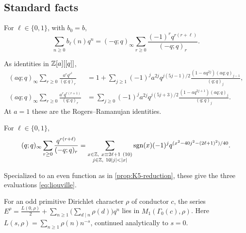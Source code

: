 \subsection{Standard facts}

\begin{fact}\label{fact:DKS}
For $\ell\in\{0,1\}$, with $b_0=b$,
\[
  \sum_{n\ge0}b_\ell(n)q^n=(-q;q)_\infty\sum_{r\ge0}\frac{(-1)^rq^{r(r+\ell)}}{(-q;q)_r}.
\]
\end{fact}

\begin{fact}\label{fact:Sills}
As identities in $\mathbb{Z}[a][[q]]$,
\begin{align*}
  (aq;q)_\infty\sum_{r\ge0}\frac{a^rq^{r^2}}{(q;q)_r}
  &=1+\sum_{j\ge1}(-1)^ja^{2j}q^{j(5j-1)/2}\frac{(1-aq^{2j})(aq;q)_{j-1}}{(q;q)_j},\\
  (aq;q)_\infty\sum_{r\ge0}\frac{a^rq^{r(r+1)}}{(q;q)_r}
  &=\sum_{j\ge0}(-1)^ja^{2j}q^{j(5j+3)/2}\frac{(1-aq^{2j+1})(aq;q)_j}{(q;q)_j}.
\end{align*}
At $a=1$ these are the Rogers--Ramanujan identities.
\end{fact}

\begin{fact}\label{fact:HR}
For $\ell\in\{0,1\}$,
\begin{equation}\label{eq:hecke-rogers}
  (q;q)_\infty\sum_{r\ge0}\frac{q^{r(r+\ell)}}{(-q;q)_r}
  =\sum_{\substack{x\in\Z,\ x\equiv2\ell+1\ (10)\\ j\in\Z,\ 10|j|<|x|}}
  \operatorname{sgn}(x)(-1)^jq^{(x^2-40j^2-(2\ell+1)^2)/40}.
\end{equation}
\end{fact}

\begin{fact}\label{fact:Liouville}
Specialized to an even function as in \cref{prop:K5-reduction}, these give the
three evaluations \eqref{eq:liouville}.
\end{fact}

\begin{fact}\label{fact:eisenstein}
For an odd primitive Dirichlet character $\rho$ of conductor $c$, the series
$E^\rho=\frac{L(0,\rho)}2+\sum_{n\ge1}\bigl(\sum_{d\mid n}\rho(d)\bigr)q^n$ lies in
$M_1(\Gamma_0(c),\rho)$. Here $L(s,\rho)=\sum_{n\ge1}\rho(n)n^{-s}$, continued
analytically to $s=0$.
\end{fact}

